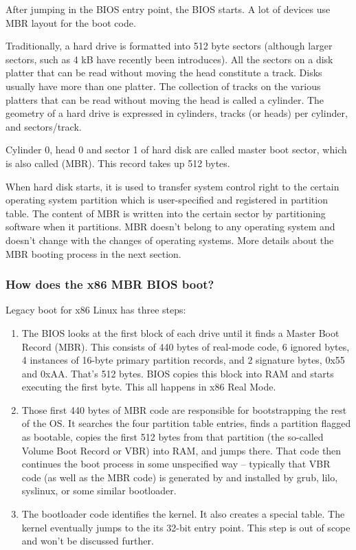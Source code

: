 \documentclass[a4paper]{article}
\begin{document}
After jumping in the BIOS entry point, the BIOS starts. A lot of devices use MBR layout for the boot code.

Traditionally, a hard drive is formatted into 512 byte sectors (although larger sectors, such as 4 kB have recently been introduces). All the sectors on a disk platter that can be read without moving the head constitute a track. Disks usually have more than one platter. The collection of tracks on the various platters that can be read without moving the head is called a cylinder. The geometry of a hard drive is expressed in cylinders, tracks (or heads) per cylinder, and sectors/track.

\begin{definition}
	Cylinder 0, head 0 and sector 1 of hard disk are called master boot sector, which is also called  (MBR). This record takes up 512 bytes.
\end{definition}
When hard disk starts, it is used to transfer system control right to the certain operating system partition which is user-specified and registered in partition table. The content of MBR is written into the certain sector by partitioning software when it partitions. MBR doesn't belong to any operating system and doesn't change with the changes of operating systems. More details about the MBR booting process in the next section.


\subsubsection{How does the x86 MBR BIOS boot?}
Legacy boot for x86 Linux has three steps:
\begin{enumerate}
\item The BIOS looks at the first block of each drive until it finds a Master Boot Record (MBR). This consists of 440 bytes of real-mode code, 6 ignored bytes, 4 instances of 16-byte primary partition records, and 2 signature bytes, 0x55 and 0xAA. That's 512 bytes. BIOS copies this block into RAM and starts executing the first byte. This all happens in x86 Real Mode.
\item Those first 440 bytes of MBR code are responsible for bootstrapping the rest of the OS. It searches the four partition table entries, finds a partition flagged as bootable, copies the first 512 bytes  from that partition (the so-called Volume Boot Record or VBR) into RAM, and jumps there. That code then continues the boot process in some unspecified way -- typically that VBR code (as well as the MBR code) is generated by and installed by grub, lilo, syslinux, or some similar bootloader.
\item The bootloader code identifies the kernel. It also creates a special table. The kernel eventually jumps to the its 32-bit entry point. This step is out of scope and won't be discussed further.
\end{enumerate}
\end{document}
